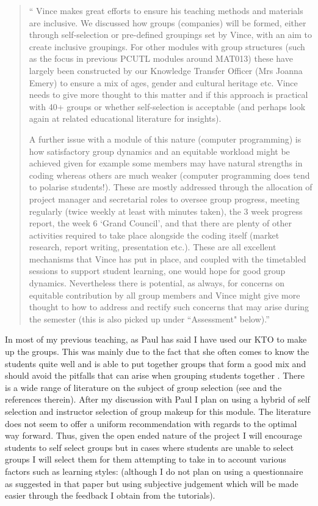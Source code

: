 \documentclass{article}
\begin{document}
\begin{quote}
`` Vince makes great efforts to ensure his teaching methods and materials are inclusive. We discussed how groups (companies) will be formed, either through self-selection or pre-defined groupings set by Vince, with an aim to create inclusive groupings. For other modules with group structures (such as the focus in previous PCUTL modules around MAT013) these have largely been constructed by our Knowledge Transfer Officer (Mrs Joanna Emery) to ensure a mix of ages, gender and cultural heritage etc. Vince needs to give more thought to this matter and if this approach is practical with 40+ groups or whether self-selection is acceptable (and perhaps look again at related educational literature for insights).

A further issue with a module of this nature (computer programming) is how satisfactory group dynamics and an equitable workload might be achieved given for example some members may have natural strengths in coding whereas others are much weaker (computer programming does tend to polarise students!). These are mostly addressed through the allocation of project manager and secretarial roles to oversee group progress, meeting regularly (twice weekly at least with minutes taken), the 3 week progress report, the week 6 `Grand Council', and that there are plenty of other activities required to take place alongside the coding itself (market research, report writing, presentation etc.). These are all excellent mechanisms that Vince has put in place, and coupled with the timetabled sessions to support student learning, one would hope for good group dynamics. Nevertheless there is potential, as always, for concerns on equitable contribution by all group members and Vince might give more thought to how to address and rectify such concerns that may arise during the semester (this is also picked up under ``Assessment" below).''
\end{quote}

In most of my previous teaching, as Paul has said I have used our KTO to make up the groups. This was mainly due to the fact that she often comes to know the students quite well and is able to put together groups that form a good mix and should avoid the pitfalls that can arise when grouping students together \cite{kember_enhancing_2007}. There is a wide range of literature on the subject of group selection (see \cite{hilton_instructor-assigned_2010} and the references therein). After my discussion with Paul I plan on using a hybrid of self selection and instructor selection of group makeup for this module. The literature does not seem to offer a uniform recommendation with regards to the optimal way forward. Thus, given the open ended nature of the project I will encourage students to self select groups but in cases where students are unable to select groups I will select them for them attempting to take in to account various factors such as learning styles: \cite{halstead_learning_2002} (although I do not plan on using a questionnaire as suggested in that paper but using subjective judgement which will be made easier through the feedback I obtain from the tutorials).
\end{document}
